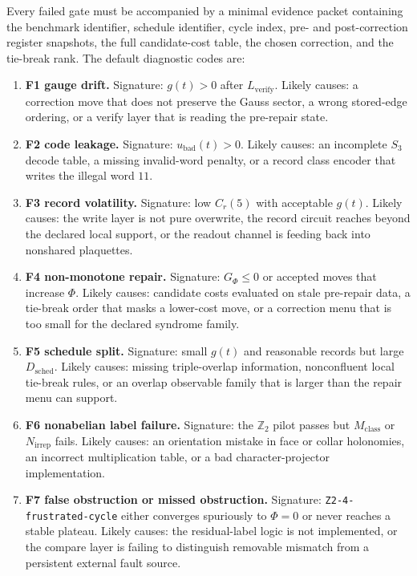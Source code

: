 \documentclass[11pt]{article}
\begin{document}
Every failed gate must be accompanied by a minimal evidence packet containing the benchmark
identifier, schedule identifier, cycle index, pre- and post-correction register snapshots, the
full candidate-cost table, the chosen correction, and the tie-break rank. The default diagnostic
codes are:
\begin{enumerate}[leftmargin=2em]
\item \textbf{F1 gauge drift.} Signature: $g(t)>0$ after $L_{\mathrm{verify}}$. Likely causes:
a correction move that does not preserve the Gauss sector, a wrong stored-edge ordering, or a
verify layer that is reading the pre-repair state.
\item \textbf{F2 code leakage.} Signature: $u_{\mathrm{bad}}(t)>0$. Likely causes: an
incomplete $S_3$ decode table, a missing invalid-word penalty, or a record class encoder that
writes the illegal word $11$.
\item \textbf{F3 record volatility.} Signature: low $C_r(5)$ with acceptable $g(t)$. Likely
causes: the write layer is not pure overwrite, the record circuit reaches beyond the declared
local support, or the readout channel is feeding back into nonshared plaquettes.
\item \textbf{F4 non-monotone repair.} Signature: $G_{\Phi}\le 0$ or accepted moves that
increase $\Phi$. Likely causes: candidate costs evaluated on stale pre-repair data, a tie-break
order that masks a lower-cost move, or a correction menu that is too small for the declared
syndrome family.
\item \textbf{F5 schedule split.} Signature: small $g(t)$ and reasonable records but large
$D_{\mathrm{sched}}$. Likely causes: missing triple-overlap information, nonconfluent local
tie-break rules, or an overlap observable family that is larger than the repair menu can
support.
\item \textbf{F6 nonabelian label failure.} Signature: the $\mathbb Z_2$ pilot passes but
$M_{\mathrm{class}}$ or $N_{\mathrm{irrep}}$ fails. Likely causes: an orientation mistake in
face or collar holonomies, an incorrect multiplication table, or a bad character-projector
implementation.
\item \textbf{F7 false obstruction or missed obstruction.} Signature:
\texttt{Z2-4-frustrated-cycle} either converges spuriously to $\Phi=0$ or never reaches a stable
plateau. Likely causes: the residual-label logic is not implemented, or the compare layer is
failing to distinguish removable mismatch from a persistent external fault source.
\end{enumerate}
\end{document}
